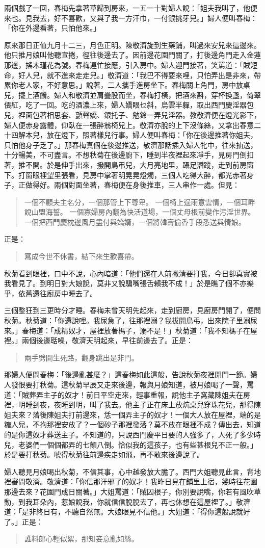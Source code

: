 兩個戲了一回，春梅先拿著草歸到房來，一五一十對婦人說：「姐夫我叫了，他便來也。見我去，好不喜歡，又與了我一方汗巾，一付銀挑牙兒。」婦人便叫春梅：「你在外邊看著，只怕他來。」

原來那日正值九月十二三，月色正明。陳敬濟旋到生藥鋪，叫過來安兒來這邊來。他只推月娘叫他聽宣捲，徑往後邊去了。因前邊花園門關了，打後邊角門走入金蓮那邊，搖木瑾花為號。春梅連忙接應，引入房中。婦人迎門接著，笑罵道：「賊短命，好人兒，就不進來走走兒。」敬濟道：「我巴不得要來哩，只怕弄出是非來，帶累你老人家，不好意思。」說著，二人攜手進房坐下。春梅關上角門，房中放桌兒，擺上酒餚。婦人和敬濟並肩疊股而坐，春梅打橫，把酒來斟，穿杯換盞，倚翠偎紅，吃了一回。吃的酒濃上來，婦人嬌眼乜斜，烏雲半軃，取出西門慶淫器包兒，裡面包著相思套、顫聲嬌、銀托子、勉鈴一弄兒淫器。教敬濟便在燈光影下，婦人便赤身露體，仰臥在一張醉翁椅兒上。敬濟亦脫的上下沒條絲，又拿出春意二十四解本兒，放在燈下，照著樣兒行事。婦人便叫春梅：「你在後邊推著你姐夫，只怕他身子乏了。」那春梅真個在後邊推送，敬濟那話插入婦人牝中，往來抽送，十分暢美，不可盡言。不想秋菊在後邊廚下，睡到半夜裡起來凈手，見房門倒扣著，推不開。於是伸手出來，撥開鳥弔兒，大月亮地里，躡足潛蹤，走到前房窗下。打窗眼裡望里張看，見房中掌著明晃晃燈燭，三個人吃得大醉，都光赤著身子，正做得好。兩個對面坐著，春梅便在身後推車，三人串作一處。但見：
\begin{quote}
一個不顧夫主名分，一個那管上下尊卑。
一個椅上逞雨意雲情，一個耳畔說山盟海誓。
一個寡婦房內翻為快活道場，一個丈母根前變作污淫世界。
一個把西門慶枕邊風月盡付與嬌婿，一個將韓壽偷香手段悉送與情娘。
\end{quote}
正是：
\begin{quote}
寫成今世不休書，結下來生歡喜帶。
\end{quote}

秋菊看到眼裡，口中不說，心內暗道：「他們還在人前撇清要打我，今日卻真實被我看見了。到明日對大娘說，莫非又說騙嘴張舌賴我不成！」於是瞧了個不亦樂乎，依舊還往廚房中睡去了。

三個整狂到三更時分才睡。春梅未曾天明先起來，走到廚房，見廚房門開了，便問秋菊。秋菊道：「你還說哩。我尿急了，往那裡溺？我拔開鳥弔，出來院子里溺尿來。」春梅道：「成精奴才，屋裡放著榪子，溺不是！」秋菊道：「我不知榪子在屋裡。」兩個後邊聒噪，敬濟天明起來，早往前邊去了。正是：
\begin{quote}
兩手劈開生死路，翻身跳出是非門。
\end{quote}

那婦人便問春梅：「後邊亂甚麼？」這春梅如此這般，告說秋菊夜裡開門一節。婦人發恨要打秋菊。這秋菊早辰又走來後邊，報與月娘知道，被月娘喝了一聲，罵道：「賊葬弄主子的奴才！前日平空走來，輕事重報，說他主子窩藏陳姐夫在房裡，明睡到夜，夜睡到明，叫了我去。他主子正在床上放炕桌兒穿珠花兒，那得陳姐夫來？落後陳姐夫打前邊來，恁一個弄主子的奴才！一個大人放在屋裡，端的是糖人兒，不拘那裡安放了？一個砂子那裡發落？莫不放在眼裡不成？傳出去，知道的是你這奴才葬送主子。不知道的，只說西門慶平日要的人強多了，人死了多少時兒，老婆們一個個都弄的七顛八倒。恰似我的這孩子，也有些甚根兒不正一般。」於是要打秋菊。唬得秋菊往前邊疾走如飛，再不敢來後邊說了。

婦人聽見月娘喝出秋菊，不信其事，心中越發放大膽了。西門大姐聽見此言，背地裡審問敬濟。敬濟道：「你信那汗邪了的奴才！我昨日見在鋪里上宿，幾時往花園那邊去來？花園門成日關著。」大姐罵道：「賊囚根子，你別要說嘴，你若有風吹草動，到我耳朵內，惹娘說我，你就信信脫脫去了，再也休想在這屋裡了。」敬濟道：「是非終日有，不聽自然無。大娘眼見不信他。」大姐道：「得你這般說就好了。」正是：
\begin{quote}
誰料郎心輕似絮，那知妾意亂如絲。
\end{quote}
